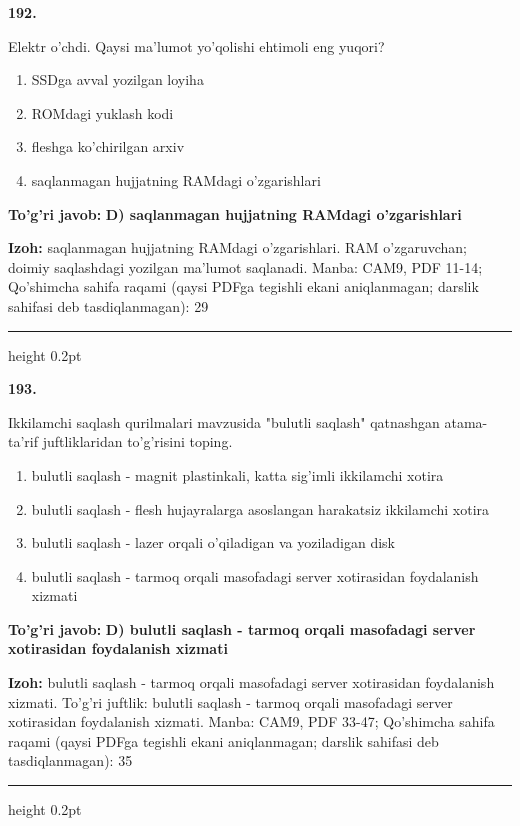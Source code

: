 \documentclass[10pt,a4paper]{article}
\begin{document}
{\bfseries\sffamily\color{ink} 192.}
\par
Elektr o'chdi. Qaysi ma'lumot yo'qolishi ehtimoli eng yuqori?
\begin{enumerate}[label=\Alph*),leftmargin=9mm]
\item SSDga avval yozilgan loyiha
\item ROMdagi yuklash kodi
\item fleshga ko'chirilgan arxiv
\item saqlanmagan hujjatning RAMdagi o'zgarishlari
\end{enumerate}
\begin{tcolorbox}[enhanced,breakable,colback=teal!4,colframe=teal!60!black,boxrule=0.45pt,arc=1.2mm,left=2.7mm,right=2.7mm,top=1.8mm,bottom=1.8mm,before skip=2mm,after skip=2mm]
{\bfseries\sffamily\color{teal}To'g'ri javob:} \textbf{D) saqlanmagan hujjatning RAMdagi o'zgarishlari}
\par\smallskip
{\bfseries Izoh:} saqlanmagan hujjatning RAMdagi o'zgarishlari. RAM o'zgaruvchan; doimiy saqlashdagi yozilgan ma'lumot saqlanadi. Manba: CAM9, PDF 11-14; Qo'shimcha sahifa raqami (qaysi PDFga tegishli ekani aniqlanmagan; darslik sahifasi deb tasdiqlanmagan): 29
\end{tcolorbox}
\vspace{2mm}\hrule height 0.2pt\vspace{3mm}

{\bfseries\sffamily\color{ink} 193.}
\par
Ikkilamchi saqlash qurilmalari mavzusida "bulutli saqlash" qatnashgan atama-ta'rif juftliklaridan to'g'risini toping.
\begin{enumerate}[label=\Alph*),leftmargin=9mm]
\item bulutli saqlash - magnit plastinkali, katta sig'imli ikkilamchi xotira
\item bulutli saqlash - flesh hujayralarga asoslangan harakatsiz ikkilamchi xotira
\item bulutli saqlash - lazer orqali o'qiladigan va yoziladigan disk
\item bulutli saqlash - tarmoq orqali masofadagi server xotirasidan foydalanish xizmati
\end{enumerate}
\begin{tcolorbox}[enhanced,breakable,colback=teal!4,colframe=teal!60!black,boxrule=0.45pt,arc=1.2mm,left=2.7mm,right=2.7mm,top=1.8mm,bottom=1.8mm,before skip=2mm,after skip=2mm]
{\bfseries\sffamily\color{teal}To'g'ri javob:} \textbf{D) bulutli saqlash - tarmoq orqali masofadagi server xotirasidan foydalanish xizmati}
\par\smallskip
{\bfseries Izoh:} bulutli saqlash - tarmoq orqali masofadagi server xotirasidan foydalanish xizmati. To'g'ri juftlik: bulutli saqlash - tarmoq orqali masofadagi server xotirasidan foydalanish xizmati. Manba: CAM9, PDF 33-47; Qo'shimcha sahifa raqami (qaysi PDFga tegishli ekani aniqlanmagan; darslik sahifasi deb tasdiqlanmagan): 35
\end{tcolorbox}
\vspace{2mm}\hrule height 0.2pt\vspace{3mm}
\end{document}
